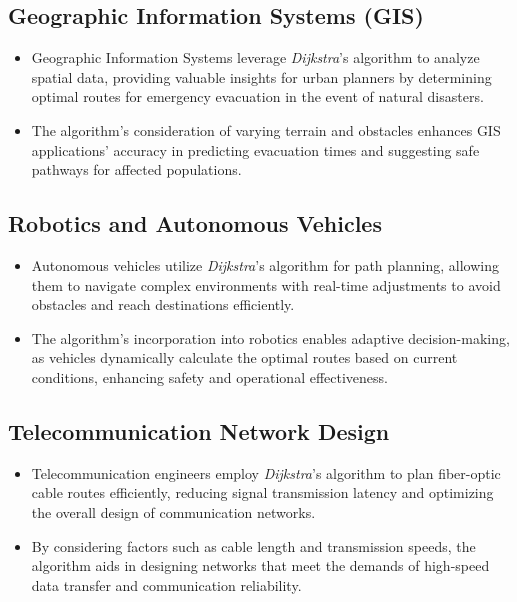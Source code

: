 \documentclass[12pt, a4paper]{article}
\begin{document}
\subsection{Geographic Information Systems (GIS)}
\begin{itemize}
  \item Geographic Information Systems leverage \textit{Dijkstra}'s algorithm to analyze spatial data, providing valuable insights for urban planners by determining optimal routes for emergency evacuation in the event of natural disasters.
  \item The algorithm's consideration of varying terrain and obstacles enhances GIS applications' accuracy in predicting evacuation times and suggesting safe pathways for affected populations.
  
\end{itemize}

\subsection{Robotics and Autonomous Vehicles}
\begin{itemize}
  \item Autonomous vehicles utilize \textit{Dijkstra}'s algorithm for path planning, allowing them to navigate complex environments with real-time adjustments to avoid obstacles and reach destinations efficiently.
  \item The algorithm's incorporation into robotics enables adaptive decision-making, as vehicles dynamically calculate the optimal routes based on current conditions, enhancing safety and operational effectiveness.
 
\end{itemize}



\subsection{Telecommunication Network Design}
\begin{itemize}
  \item Telecommunication engineers employ \textit{Dijkstra}'s algorithm to plan fiber-optic cable routes efficiently, reducing signal transmission latency and optimizing the overall design of communication networks.
  \item By considering factors such as cable length and transmission speeds, the algorithm aids in designing networks that meet the demands of high-speed data transfer and communication reliability.

\end{itemize}
\end{document}
